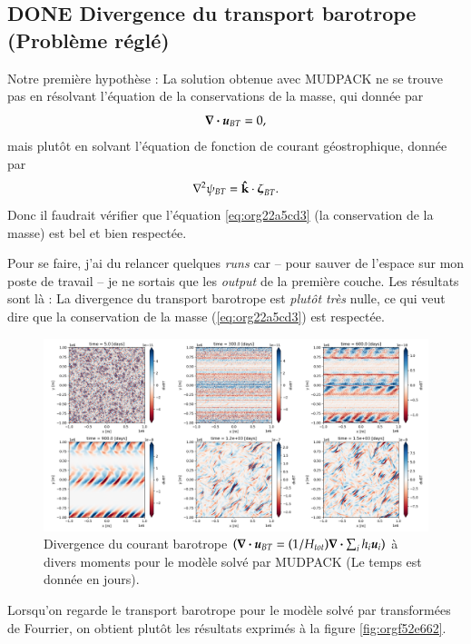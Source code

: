 \documentclass[10pt]{article}
\numberwithin{equation}{section}
\newcommand{\kvf}{\vb{\hat{k}}}
\newcommand{\uu}{\vb*{u}}
\begin{document}
\subsection{{\bfseries\sffamily DONE} Divergence du transport barotrope (Problème réglé)}
\label{sec:orgab6be0f}
Notre première hypothèse : La solution obtenue avec MUDPACK ne se trouve pas en résolvant l'équation de la conservations de la masse, qui donnée par
\begin{equation}
\label{eq:org22a5cd3}
   \div{\uu_{BT}} = 0,
\end{equation}
mais plutôt en solvant l'équation de fonction de courant géostrophique, donnée par
\begin{equation}
   \laplacian{\psi_{BT}} = \kvf \cdot \boldsymbol{\zeta}_{BT}.
\end{equation}
Donc il faudrait vérifier que l'équation \ref{eq:org22a5cd3} (la conservation de la masse) est bel et bien respectée.\bigskip

Pour se faire, j'ai du relancer quelques \emph{runs} car -- pour sauver de l'espace sur mon poste de travail -- je ne sortais que les \emph{output} de la première couche.
Les résultats sont là :
La divergence du transport barotrope est \emph{plutôt très} nulle, ce qui veut dire que la conservation de la masse (\ref{eq:org22a5cd3}) est respectée.

\begin{figure}[!htpb]
\centering
\includegraphics[width=.9\linewidth]{figures/debuggage/2023_06_21divBT1_MUD.png}
\caption{\label{fig:org164d71d}Divergence du courant barotrope \(\qty(\div{\uu_{BT}} = \qty(1/H_{tot}) \div{\sum_i h_i \uu_i})\) à divers moments pour le modèle solvé par MUDPACK (Le temps est donnée en jours).}
\end{figure}

Lorsqu'on regarde le transport barotrope pour le modèle solvé par transformées de Fourrier, on obtient plutôt les résultats exprimés à la figure \ref{fig:orgf52e662}. 
\end{document}
